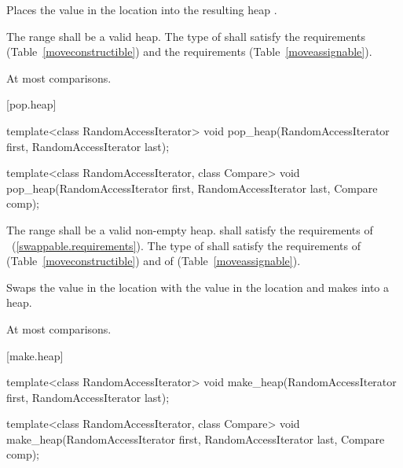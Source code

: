 \begin{itemdescr}
\pnum
\effects
Places the value in the location
into the resulting heap
.

\pnum
\requires
The range
shall be a valid heap.
The type of  shall satisfy
the  requirements
(Table~\ref{moveconstructible}) and the
 requirements
(Table~\ref{moveassignable}).


\pnum
\complexity
At most
comparisons.
\end{itemdescr}

[pop.heap]{}

%
\begin{itemdecl}
template<class RandomAccessIterator>
  void pop_heap(RandomAccessIterator first, RandomAccessIterator last);

template<class RandomAccessIterator, class Compare>
  void pop_heap(RandomAccessIterator first, RandomAccessIterator last,
                Compare comp);
\end{itemdecl}

\begin{itemdescr}
\pnum
\requires
The range
shall be a valid non-empty heap.
 shall satisfy the requirements of
~(\ref{swappable.requirements}). The type
of  shall satisfy the requirements of
 (Table~\ref{moveconstructible}) and of
 (Table~\ref{moveassignable}).


\pnum
\effects
Swaps the value in the location 
with the value in the location
and makes
into a heap.

\pnum
\complexity
At most
comparisons.
\end{itemdescr}

[make.heap]{}

%
\begin{itemdecl}
template<class RandomAccessIterator>
  void make_heap(RandomAccessIterator first, RandomAccessIterator last);

template<class RandomAccessIterator, class Compare>
  void make_heap(RandomAccessIterator first, RandomAccessIterator last,
                 Compare comp);
\end{itemdecl}


